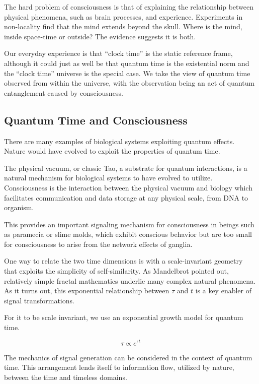 The hard problem of consciousness \cite{Chalmers} is that of explaining the
relationship between physical phenomena, such as brain processes,
and experience.
Experiments in non-locality \cite{Achterberg} find that the mind extends beyond
the skull. Where is the mind, inside space-time or outside?
The evidence suggests it is both.

Our everyday experience is that ``clock time'' is the static reference frame,
although it could just as well be that quantum time is the existential norm
and the ``clock time'' universe is the special case.
We take the view of quantum time observed from within the universe, with
the observation being an act of quantum entanglement caused by consciousness.

\subsection{Quantum Time and Consciousness}

There are many examples of biological systems exploiting quantum effects.
Nature would have evolved to exploit the properties of quantum time.

The physical vacuum, or classic Tao, a substrate for quantum interactions,
is a natural mechanism for biological systems to have evolved to utilize.
Consciousness is the interaction between the physical vacuum and biology which
facilitates communication and data storage at any physical scale,
from DNA to organism.

This provides an important signaling mechanism for consciousness in beings such
as paramecia or slime molds, which exhibit conscious behavior but are too small
for consciousness to arise from the network effects of ganglia.

One way to relate the two time dimensions is with a scale-invariant geometry
that exploits the simplicity of self-similarity.
As Mandelbrot \cite{Mandelbrot} pointed out, relatively simple fractal
mathematics underlie many complex natural phenomena.
As it turns out, this exponential relationship between $\tau$ and $t$
is a key enabler of signal transformations.

For it to be scale invariant,
we use an exponential growth model for quantum time.

\begin{equation} \label{eq:pink}
\tau \propto e^{\epsilon t}
\end{equation}

The mechanics of signal generation can be considered in the context of
quantum time.
This arrangement lends itself to information flow, utilized by nature,
between the time and timeless domains.

